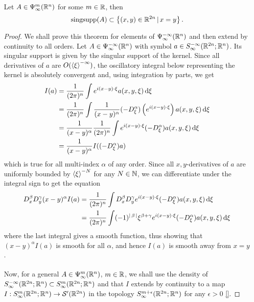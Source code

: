 \documentclass[12pt]{article}
\begin{document}
\begin{fprop}
    Let $A \in \Psi^m_\infty(\R^n)$ for some $m \in \R$, then
    \[
    \mathrm{sing supp}(A) \subset \set{(x, y) \in \R^{2n} \wh x = y}. 
    \]
\end{fprop}
\begin{proof}
    We shall prove this theorem for elements of $\Psi^{-\infty}_\infty(\R^n)$ and then extend by continuity to all orders. 
    Let $A \in \Psi^{-\infty}_\infty(\R^n)$ with symbol $a \in S^{-\infty}_\infty(\R^{2n}; \R^n)$. Its singular support is given by the singular support of the kernel. Since all derivatives of $a$ are $O(\sym[\xi]^{-\infty})$, the oscillatory integral below representing the kernel is absolutely convergent  and, using integration by parts, we get
    \begin{align*}
        I(a) 
        & = \frac{1}{(2\pi)^n} \int e^{i(x - y) \cdot \xi} a(x, y, \xi) \d[\xi] \\
        & = \frac{1}{(2\pi)^n}  \int \frac{1}{(x - y)^\alpha} (-D^\alpha_\xi) \brac{e^{i(x - y) \cdot \xi} }a(x, y, \xi) \d[\xi] \\
        & = \frac{1}{(x - y)^\alpha} \frac{1}{(2\pi)^n} \int e^{i(x - y) \cdot \xi} (-D^\alpha_\xi) a(x, y, \xi) \d[\xi] \\
        & = \frac{1}{(x - y)^\alpha} I((-D^\alpha_\xi)a)
    \end{align*}
    which is true for all multi-index $\alpha$ of any order. Since all $x, y$-derivatives of $a$ are uniformly bounded by $\sym[\xi]^{-N}$ for any $N \in \N$, we can differentiate under the integral sign to get the equation
    \begin{align*}
        D^\beta_x D^\gamma_y (x - y)^\alpha I(a) 
        & = \frac{1}{(2\pi)^n} \int D^\beta_x D^\gamma_y e^{i(x - y) \cdot \xi} (-D^\alpha_\xi) a(x, y, \xi) \d[\xi] \\
        & = \frac{1}{(2\pi)^n} \int (-1)^{\abs{\beta}}\xi^{\beta + \gamma}e^{i(x - y) \cdot \xi} (-D^\alpha_\xi) a(x, y, \xi) \d[\xi] \\
    \end{align*}
    where the last integral gives a smooth function, thus showing that $(x - y)^\alpha I(a)$ is smooth for all $\alpha$, and hence $I(a)$ is smooth away from $x = y$. \\
    \\
    Now, for a general $A \in \Psi^m_\infty(\R^n)$, $m \in \R$, we shall use the  density of $S^{-\infty}_\infty(\R^{2n}; \R^n) \subset S^{m}_\infty(\R^{2n}; \R^n)$ and that $I$ extends by continuity to a map $I : S^{m}_\infty(\R^{2n}; \R^n) \to \sch'(\R^{2n})$ in the topology $S^{m + \epsilon}_\infty(\R^{2n}; \R^n)$ for any $\epsilon > 0$  \ref{}. 
    
    
\end{proof}
\end{document}

